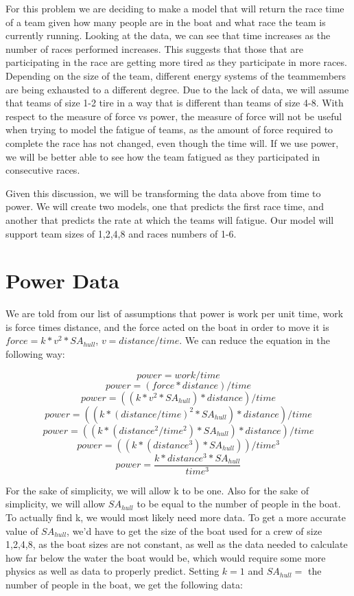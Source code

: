 \documentclass[12pt]{article} %
\begin{document}
For this problem we are deciding to make a model that will return the race time of a team given how many people are in the boat and what race the team is currently running. Looking at the data, we can see that time increases as the number of races performed increases. This suggests that those that are participating in the race are getting more tired as they participate in more races. Depending on the size of the team, different energy systems of the teammembers are being exhausted to a different degree. Due to the lack of data, we will assume that teams of size 1-2 tire in a way that is different than teams of size 4-8. With respect to the measure of force vs power, the measure of force will not be useful when trying to model the fatigue of teams, as the amount of force required to complete the race has not changed, even though the time will. If we use power, we will be better able to see how the team fatigued as they participated in consecutive races.

Given this discussion, we will be transforming the data above from time to power. We will create two models, one that predicts the first race time, and another that predicts the rate at which the teams will fatigue. Our model will support team sizes of 1,2,4,8 and races numbers of 1-6.

\section*{Power Data}

We are told from our list of assumptions that power is work per unit time, work is force times distance, and the force acted on the boat in order to move it is $force = k*v^{2}*SA_{hull}$, $v = distance/time$. We can reduce the equation in the following way:

\[power = work/time\]
\[power = (force*distance)/time\]
\[power = ((k*v^{2}*SA_{hull})*distance)/time\]
\[power = ((k*(distance/time)^{2}*SA_{hull})*distance)/time\]
\[power = ((k*(distance^{2}/time^{2})*SA_{hull})*distance)/time\]
\[power = ((k*(distance^{3})*SA_{hull}))/time^{3}\]
\[power = \frac{k*distance^{3}*SA_{hull}}{time^{3}}\]

For the sake of simplicity, we will allow k to be one. Also for the sake of simplicity, we will allow $SA_{hull}$ to be equal to the number of people in the boat. To actually find k, we would most likely need more data. To get a more accurate value of $SA_{hull}$, we'd have to get the size of the boat used for a crew of size 1,2,4,8, as the boat sizes are not constant, as well as the data needed to calculate how far below the water the boat would be, which would require some more physics as well as data to properly predict. Setting $k=1$ and $SA_{hull} =$ the number of people in the boat, we get the following data:
\\
\end{document}
